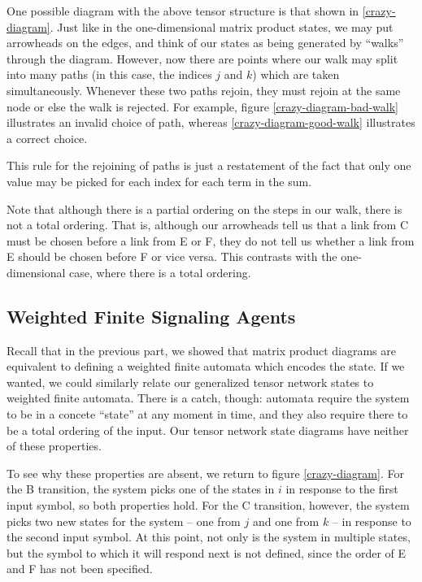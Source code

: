 \documentclass{amsbook}
\theoremstyle{plain}
\theoremstyle{definition}
\theoremstyle{remark}
\begin{document}
One possible diagram with the above tensor structure is that shown in \ref{crazy-diagram}.  Just like in the one-dimensional matrix product states, we may put arrowheads on the edges, and think of our states as being generated by ``walks'' through the diagram.  However, now there are points where our walk may split into many paths (in this case, the indices $j$ and $k$) which are taken simultaneously.  Whenever these two paths rejoin, they must rejoin at the same node or else the walk is rejected.  For example, figure \ref{crazy-diagram-bad-walk} illustrates an invalid choice of path, whereas \ref{crazy-diagram-good-walk} illustrates a correct choice.

This rule for the rejoining of paths is just a restatement of the fact that only one value may be picked for each index for each term in the sum.

Note that although there is a partial ordering on the steps in our walk, there is not a total ordering.  That is, although our arrowheads tell us that a link from C must be chosen before a link from E or F, they do not tell us whether a link from E should be chosen before F or vice versa.  This contrasts with the one-dimensional case, where there is a total ordering.
\subsection{Weighted Finite Signaling Agents}

Recall that in the previous part, we showed that matrix product diagrams are equivalent to defining a weighted finite automata which encodes the state.  If we wanted, we could similarly relate our generalized tensor network states to weighted finite automata.  There is a catch, though:  automata require the system to be in a concete ``state'' at any moment in time, and they also require there to be a total ordering of the input.  Our tensor network state diagrams have neither of these properties.

To see why these properties are absent, we return to figure \ref{crazy-diagram}.  For the B transition, the system picks one of the states in $i$ in response to the first input symbol, so both properties hold.  For the C transition, however, the system picks two new states for the system -- one from $j$ and one from $k$ -- in response to the second input symbol.  At this point, not only is the system in multiple states, but the symbol to which it will respond next is not defined, since the order of E and F has not been specified.
\end{document}
